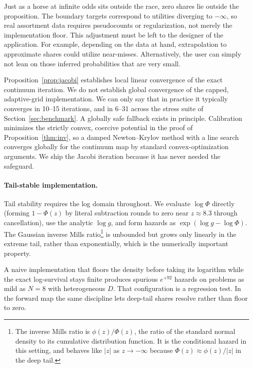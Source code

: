 \documentclass[12pt]{article}
\theoremstyle{remark}
\begin{document}
Just as a horse at infinite odds sits outside the race, zero shares lie outside the proposition. The boundary targets
correspond to utilities diverging to $-\infty$, so real assortment data
requires pseudocounts or regularization, not merely the implementation
floor. This adjustment must be left to the designer of the application. For example, depending
on the data at hand, extrapolation to approximate shares could utilize near-misses. Alternatively, the user can
simply not lean on those inferred probabilities that are very small. 

Proposition~\ref{prop:jacobi} establishes local linear convergence of
the exact continuum iteration. We do not establish global convergence
of the capped, adaptive-grid implementation. We can only
say that in practice it typically converges in 10--15 iterations, and in 6--31 across the stress suite of
Section~\ref{sec:benchmark}. A globally safe fallback exists in
principle. Calibration minimizes the strictly convex, coercive
potential in the proof of Proposition~\ref{thm:inv}, so a damped
Newton--Krylov method with a line search converges globally for the
continuum map by standard convex-optimization arguments. We ship the
Jacobi iteration because it has never needed the safeguard.

\paragraph{Tail-stable implementation.} Tail stability requires the log
domain throughout. We evaluate $\log \Phi$ directly (forming $1 - \Phi(z)$
by literal subtraction rounds to zero near $z \approx 8.3$ through
cancellation), use the analytic $\log g$, and form hazards as
$\exp(\log g - \log \Phi)$. The Gaussian inverse Mills ratio\footnote{The
inverse Mills ratio is $\phi(z)/\Phi(z)$, the ratio of the standard
normal density to its cumulative distribution function. It is the
conditional hazard in this setting, and behaves like $|z|$ as $z \to
-\infty$ because $\Phi(z) \approx \phi(z)/|z|$ in the deep tail.} is
unbounded but grows only linearly in the extreme tail, rather than
exponentially, which is the numerically important property.

A naive implementation that floors the density before taking its
logarithm while the exact log-survival stays finite produces spurious $e^{+92}$ hazards on problems as
mild as $N = 8$ with heterogeneous $D$.  That configuration is a regression
test. In the forward map the same discipline lets deep-tail shares resolve
rather than floor to zero. 
\end{document}
